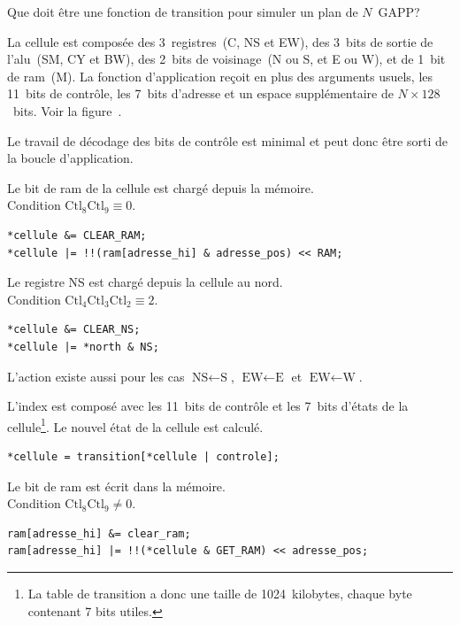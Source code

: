 Que doit être une fonction de transition pour simuler un plan de $N$~GAPP\@?

La cellule est composée %
des 3~registres~(C, NS et EW), %
des 3~bits de sortie de l'alu~(SM, CY et BW), %
des 2~bits de voisinage~(N ou S, et E ou W), %
et de 1~bit de ram~(M). %
La fonction d'application reçoit en plus des arguments usuels, %
les 11~bits de contrôle, %
les 7~bits d'adresse %
et un espace supplémentaire de $N \times  128$~bits. %
Voir la figure~. %

Le travail de décodage des bits de contrôle est minimal et peut donc
être sorti de la boucle d'application. %

Le bit de ram de la cellule est chargé depuis la mémoire.\\
Condition $\text{Ctl}_{8} \text{Ctl}_{9} \equiv 0$. %

\begin{verbatim}
*cellule &= CLEAR_RAM;
*cellule |= !!(ram[adresse_hi] & adresse_pos) << RAM;
\end{verbatim}

Le registre NS est chargé depuis la cellule au nord.\\
Condition $\text{Ctl}_{4} \text{Ctl}_{3} \text{Ctl}_{2} \equiv 2$. %

\begin{verbatim}
*cellule &= CLEAR_NS;
*cellule |= *north & NS;
\end{verbatim}

L'action existe aussi pour les cas $\text{NS} \leftarrow \text{S}$,
$\text{EW} \leftarrow \text{E}$ et $\text{EW} \leftarrow \text{W}$. %

L'index est composé avec les 11~bits de contrôle et
les 7~bits d'états de la cellule\footnote{%
  La table de transition a donc une taille de 1024~kilobytes,
  chaque byte contenant 7 bits utiles.}. %
Le nouvel état de la cellule est calculé. %

\begin{verbatim}
*cellule = transition[*cellule | controle];
\end{verbatim}

Le bit de ram est écrit dans la mémoire.\\
Condition $\text{Ctl}_{8} \text{Ctl}_{9} \neq 0$. %

\begin{verbatim}
ram[adresse_hi] &= clear_ram;
ram[adresse_hi] |= !!(*cellule & GET_RAM) << adresse_pos;
\end{verbatim}

